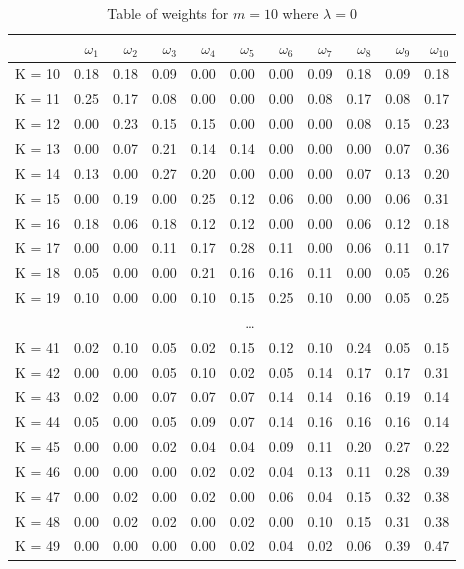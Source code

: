 \documentclass[a4paper,11pt]{article}
\begin{document}
\begin{table}[hh]
	\caption{Table of weights for $m=10$ where $\lambda = 0$}
	\centering
	\begin{tabular}{rrrrrrrrrrr}
		\hline
		& $\omega_1$ &  $\omega_2$ &  $\omega_3$ &  $\omega_4$ &  $\omega_5$ &  $\omega_6$ &  $\omega_7$ &  $\omega_8$ &  $\omega_9$ &  $\omega_10$ \\ 
		\hline
		K = 10 & 0.18 & 0.18 & 0.09 & 0.00 & 0.00 & 0.00 & 0.09 & 0.18 & 0.09 & 0.18 \\ 
		K = 11 & 0.25 & 0.17 & 0.08 & 0.00 & 0.00 & 0.00 & 0.08 & 0.17 & 0.08 & 0.17 \\ 
		K = 12 & 0.00 & 0.23 & 0.15 & 0.15 & 0.00 & 0.00 & 0.00 & 0.08 & 0.15 & 0.23 \\ 
		K = 13 & 0.00 & 0.07 & 0.21 & 0.14 & 0.14 & 0.00 & 0.00 & 0.00 & 0.07 & 0.36 \\ 
		K = 14 & 0.13 & 0.00 & 0.27 & 0.20 & 0.00 & 0.00 & 0.00 & 0.07 & 0.13 & 0.20 \\ 
		K = 15 & 0.00 & 0.19 & 0.00 & 0.25 & 0.12 & 0.06 & 0.00 & 0.00 & 0.06 & 0.31 \\ 
		K = 16 & 0.18 & 0.06 & 0.18 & 0.12 & 0.12 & 0.00 & 0.00 & 0.06 & 0.12 & 0.18 \\ 
		K = 17 & 0.00 & 0.00 & 0.11 & 0.17 & 0.28 & 0.11 & 0.00 & 0.06 & 0.11 & 0.17 \\ 
		K = 18 & 0.05 & 0.00 & 0.00 & 0.21 & 0.16 & 0.16 & 0.11 & 0.00 & 0.05 & 0.26 \\ 
		K = 19 & 0.10 & 0.00 & 0.00 & 0.10 & 0.15 & 0.25 & 0.10 & 0.00 & 0.05 & 0.25 \\ 
		&&&&&\dots\\
		K = 41 & 0.02 & 0.10 & 0.05 & 0.02 & 0.15 & 0.12 & 0.10 & 0.24 & 0.05 & 0.15 \\ 
		K = 42 & 0.00 & 0.00 & 0.05 & 0.10 & 0.02 & 0.05 & 0.14 & 0.17 & 0.17 & 0.31 \\ 
		K = 43 & 0.02 & 0.00 & 0.07 & 0.07 & 0.07 & 0.14 & 0.14 & 0.16 & 0.19 & 0.14 \\ 
		K = 44 & 0.05 & 0.00 & 0.05 & 0.09 & 0.07 & 0.14 & 0.16 & 0.16 & 0.16 & 0.14 \\ 
		K = 45 & 0.00 & 0.00 & 0.02 & 0.04 & 0.04 & 0.09 & 0.11 & 0.20 & 0.27 & 0.22 \\ 
		K = 46 & 0.00 & 0.00 & 0.00 & 0.02 & 0.02 & 0.04 & 0.13 & 0.11 & 0.28 & 0.39 \\ 
		K = 47 & 0.00 & 0.02 & 0.00 & 0.02 & 0.00 & 0.06 & 0.04 & 0.15 & 0.32 & 0.38 \\ 
		K = 48 & 0.00 & 0.02 & 0.02 & 0.00 & 0.02 & 0.00 & 0.10 & 0.15 & 0.31 & 0.38 \\ 
		K = 49 & 0.00 & 0.00 & 0.00 & 0.00 & 0.02 & 0.04 & 0.02 & 0.06 & 0.39 & 0.47 \\ 
		\hline
	\end{tabular}
\end{table}
\end{document}
